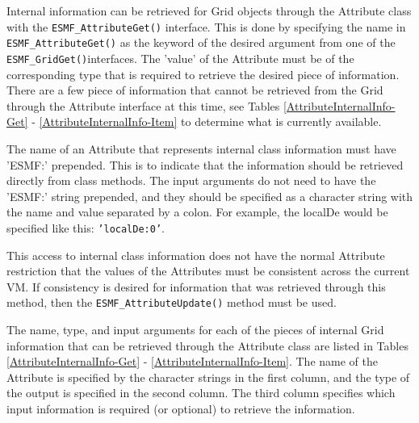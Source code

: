 
\label{sec:InternalInfo}

Internal information can be retrieved for Grid objects through the Attribute 
class with the {\tt ESMF\_AttributeGet()} interface.  This is done by 
specifying the name in {\tt ESMF\_AttributeGet()} as the keyword of the 
desired argument from one of the {\tt ESMF\_GridGet()}interfaces.  
The 'value' of the Attribute must be of the corresponding type
that is required to retrieve the desired piece of information.  There are 
a few piece of information that cannot be retrieved from the Grid
through the Attribute interface at this time, see Tables 
\ref{AttributeInternalInfo-Get} - \ref{AttributeInternalInfo-Item} to
determine what is currently available.

The name of an Attribute that represents internal class information must have 
'ESMF:' prepended.  This is to indicate that the information should be retrieved
directly from class methods.  The input arguments do not need to have the 'ESMF:'
string prepended, and they should be specified as a character string with the name
and value separated by a colon.  For example, the localDe would be specified 
like this: {\tt 'localDe:0'}.

This access to internal class information does not
have the normal Attribute restriction that the values of the Attributes must be
consistent across the current VM.  If consistency is desired for information that
was retrieved through this method, then the {\tt ESMF\_AttributeUpdate()} method
must be used.

The name, type, and input arguments for each of the pieces of internal
Grid information that can be retrieved through the Attribute class are listed
in Tables \ref{AttributeInternalInfo-Get} - \ref{AttributeInternalInfo-Item}.
The name of the Attribute is specified by the character strings in the first 
column, and the type of the output is specified in the second column.
The third column specifies which input information is 
required (or optional) to retrieve the information.

